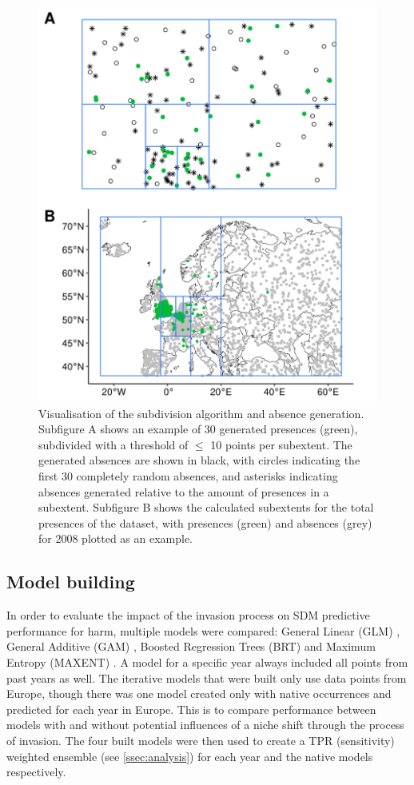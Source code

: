 \documentclass[12pt,a4paper]{article}
\begin{document}
\begin{figure}[!h]
    \centering
    \includegraphics[width = 0.8\linewidth]{"../../R/figures/ext-subdiv.png"}
    \caption{\label{fig:ext_subdiv} Visualisation of the subdivision algorithm and absence generation. Subfigure A shows an example of 30 generated presences (green), subdivided with a threshold of $\leq$ 10 points per subextent. The generated absences are shown in black, with circles indicating the first 30 completely random absences, and asterisks indicating absences generated relative to the amount of presences in a subextent. Subfigure B shows the calculated subextents for the total presences of the dataset, with presences (green) and absences (grey) for 2008 plotted as an example.}
\end{figure}

\subsection{Model building} \label{ssec:modelbuilding}

In order to evaluate the impact of the invasion process on SDM predictive performance for \gls{harm}, multiple models were compared: General Linear (GLM) \autocite{guisan2002glm-gam}, General Additive (GAM) \autocite{guisan2002glm-gam}, Boosted Regression Trees (BRT) \autocite{elith2008brt} and Maximum Entropy (MAXENT) \autocite{phillips2017maxnet}.
A model for a specific year always included all points from past years as well.
The iterative models that were built only use data points from Europe, though there was one model created only with native occurrences and predicted for each year in Europe.
This is to compare performance between models with and without potential influences of a niche shift through the process of invasion.
The four built models were then used to create a TPR (sensitivity) weighted ensemble (see \ref{ssec:analysis}) for each year and the native models respectively.
\end{document}
